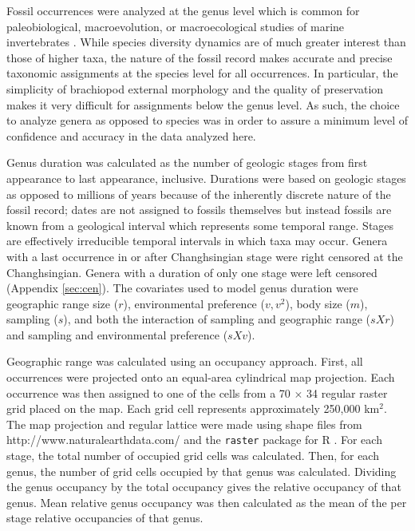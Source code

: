 \documentclass{article}
\begin{document}
Fossil occurrences were analyzed at the genus level which is common for paleobiological, macroevolution, or macroecological studies of marine invertebrates \citep{Alroy2010,Foote2013,Harnik2013,Kiessling2007a,Miller2009a,Nurnberg2013a,Nurnberg2015,Payne2007,Simpson2009,Vilhena2013}. While species diversity dynamics are of much greater interest than those of higher taxa, the nature of the fossil record makes accurate and precise taxonomic assignments at the species level for all occurrences. In particular, the simplicity of brachiopod external morphology and the quality of preservation makes it very difficult for assignments below the genus level. As such, the choice to analyze genera as opposed to species was in order to assure a minimum level of confidence and accuracy in the data analyzed here.

Genus duration was calculated as the number of geologic stages from first appearance to last appearance, inclusive. Durations were based on geologic stages as opposed to millions of years because of the inherently discrete nature of the fossil record; dates are not assigned to fossils themselves but instead fossils are known from a geological interval which represents some temporal range. Stages are effectively irreducible temporal intervals in which taxa may occur. Genera with a last occurrence in or after Changhsingian stage were right censored at the Changhsingian. Genera with a duration of only one stage were left censored (Appendix \ref{sec:cen}). The covariates used to model genus duration were geographic range size (\(r\)), environmental preference (\(v, v^{2}\)), body size (\(m\)), sampling (\(s\)), and both the interaction of sampling and geographic range (\(sXr\)) and sampling and environmental preference (\(sXv\)). 

Geographic range was calculated using an occupancy approach. First, all occurrences were projected onto an equal-area cylindrical map projection. Each occurrence was then assigned to one of the cells from a 70 \(\times\) 34 regular raster grid placed on the map. Each grid cell represents approximately 250,000 km\(^{2}\). The map projection and regular lattice were made using shape files from http://www.naturalearthdata.com/ and the \texttt{raster} package for R \citep{raster}. For each stage, the total number of occupied grid cells was calculated. Then, for each genus, the number of grid cells occupied by that genus was calculated. Dividing the genus occupancy by the total occupancy gives the relative occupancy of that genus. Mean relative genus occupancy was then calculated as the mean of the per stage relative occupancies of that genus. 
\end{document}
